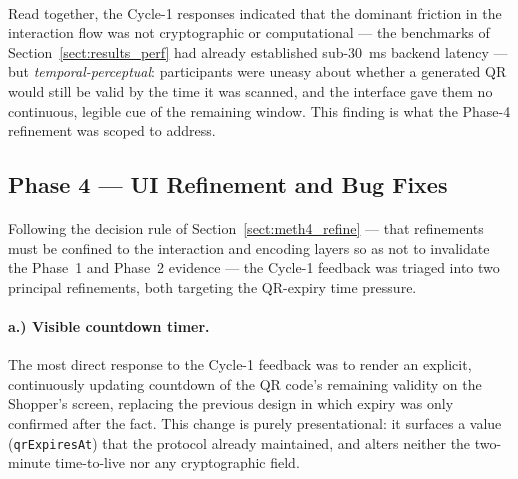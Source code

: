 \paragraph{}Read together, the Cycle-1 responses indicated that the dominant friction in the interaction flow was not cryptographic or computational --- the benchmarks of Section~\ref{sect:results_perf} had already established sub-$30$~ms backend latency --- but \textit{temporal-perceptual}: participants were uneasy about whether a generated QR would still be valid by the time it was scanned, and the interface gave them no continuous, legible cue of the remaining window. This finding is what the Phase-4 refinement was scoped to address.

\subsection{Phase 4 --- UI Refinement and Bug Fixes}
\label{sect:results_refine}

\paragraph{}Following the decision rule of Section~\ref{sect:meth4_refine} --- that refinements must be confined to the interaction and encoding layers so as not to invalidate the Phase~1 and Phase~2 evidence --- the Cycle-1 feedback was triaged into two principal refinements, both targeting the QR-expiry time pressure.

\paragraph{a.) Visible countdown timer.} The most direct response to the Cycle-1 feedback was to render an explicit, continuously updating countdown of the QR code's remaining validity on the Shopper's screen, replacing the previous design in which expiry was only confirmed after the fact. This change is purely presentational: it surfaces a value (\texttt{qrExpiresAt}) that the protocol already maintained, and alters neither the two-minute time-to-live nor any cryptographic field.

